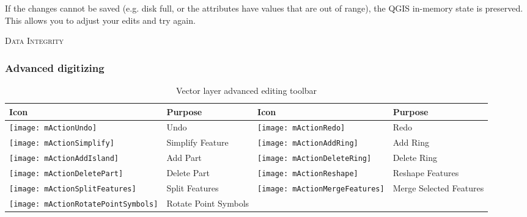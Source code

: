 If the changes cannot be saved (e.g. disk full, or the attributes have
values that are out of range), the QGIS in-memory state is preserved.  This
allows you to adjust your edits and try again.

\begin{Tip}[ht]\caption{\textsc{Data Integrity}}
\end{Tip}

\subsubsection{Advanced digitizing}
\label{sec:advanced_edit}

\begin{table}[h]
\centering
\caption{Vector layer advanced editing toolbar}\label{tab:advanced_editing}\medskip
\small
\begin{tabular}{|l|p{6.9cm}|l|p{6.9cm}|}
\hline \textbf{Icon} & \textbf{Purpose} & \textbf{Icon} & \textbf{Purpose} \\
\hline \texttt{[image: mActionUndo]}
   & Undo 
   & \texttt{[image: mActionRedo]}
   & Redo \\
\hline \texttt{[image: mActionSimplify]}
   & Simplify Feature
   & \texttt{[image: mActionAddRing]}
   & Add Ring \\
\hline \texttt{[image: mActionAddIsland]}
   & Add Part
   & \texttt{[image: mActionDeleteRing]}
   & Delete Ring \\
\hline \texttt{[image: mActionDeletePart]}
   & Delete Part
   & \texttt{[image: mActionReshape]}
   & Reshape Features \\
\hline \texttt{[image: mActionSplitFeatures]}
   & Split Features
   & \texttt{[image: mActionMergeFeatures]}
   & Merge Selected Features \\
\hline \texttt{[image: mActionRotatePointSymbols]}
   & Rotate Point Symbols
   &
   & \\
\hline
\end{tabular}
\end{table}


